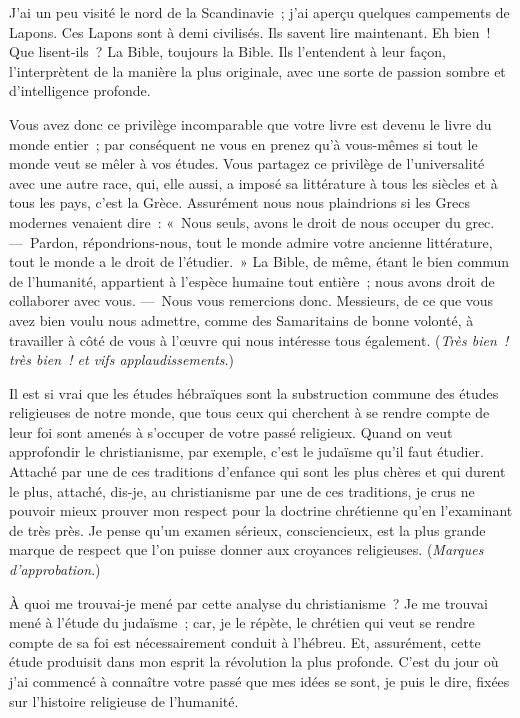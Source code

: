 \documentclass[french,twoside]{book} %
\newcommand\orgName[1]{#1}
\newcommand\placeName[1]{#1}
\begin{document}
J’ai un peu visité le nord de la {\placeName Scandinavie} ; j’ai aperçu quelques campements de Lapons. Ces Lapons sont à demi civilisés. Ils savent lire maintenant. Eh bien ! Que lisent-ils ? La Bible, toujours la Bible. Ils l’entendent à leur façon, l’interprètent de la manière la plus originale, avec une sorte de passion sombre et d’intelligence profonde.\par
Vous avez donc ce privilège incomparable que votre livre est devenu le livre du monde entier ; par conséquent ne vous en prenez qu’à vous-mêmes si tout le monde veut se mêler à vos études. Vous partagez ce privilège de l’universalité avec une autre race, qui, elle aussi, a imposé sa littérature à tous les siècles et à tous les pays, c’est la {\placeName Grèce}. Assurément nous nous plaindrions si les {\orgName Grecs modernes} venaient dire : « Nous seuls, avons le droit de nous occuper du grec. — Pardon, répondrions-nous, tout le monde admire votre ancienne littérature, tout le monde a le droit de l’étudier. » La Bible, de même, étant le bien commun de l’humanité, appartient à l’espèce humaine tout entière ; nous avons droit de collaborer avec vous. — Nous vous remercions donc. Messieurs, de ce que vous avez bien voulu nous admettre, comme des Samaritains de bonne volonté, à travailler à côté de vous à l’œuvre qui nous intéresse tous également. ({\itshape Très bien ! très bien ! et vifs applaudissements}.)\par
Il est si vrai que les études hébraïques sont la substruction commune des études religieuses de notre monde, que tous ceux qui cherchent à se rendre compte de leur foi sont amenés à s’occuper de votre passé religieux. Quand on veut approfondir le christianisme, par exemple, c’est le judaïsme qu’il faut étudier. Attaché par une de ces traditions d’enfance qui sont les plus chères et qui durent le plus, attaché, dis-je, au christianisme par une de ces traditions, je crus ne pouvoir mieux prouver mon respect pour la doctrine chrétienne qu’en l’examinant de très près. Je pense qu’un examen sérieux, consciencieux, est la plus grande marque de respect que l’on puisse donner aux croyances religieuses. ({\itshape Marques d’approbation}.)\par
À quoi me trouvai-je mené par cette analyse du christianisme ? Je me trouvai mené à l’étude du judaïsme ; car, je le répète, le chrétien qui veut se rendre compte de sa foi est nécessairement conduit à l’hébreu. Et, assurément, cette étude produisit dans mon esprit la révolution la plus profonde. C’est du jour où j’ai commencé à connaître votre passé que mes idées se sont, je puis le dire, fixées sur l’histoire religieuse de l’humanité.\par
\end{document}
